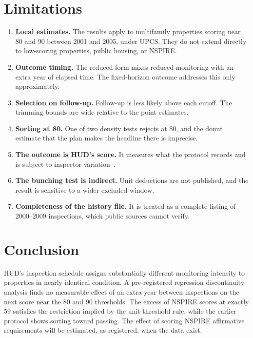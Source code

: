 \documentclass[10pt,twocolumn,letterpaper]{article}
\begin{document}
\section{Limitations}\label{sec:limits}
\begin{enumerate}
\item \textbf{Local estimates.} The results apply to multifamily properties scoring near 80 and 90 between 2001 and 2005, under UPCS. They do not extend directly to low-scoring properties, public housing, or NSPIRE.
\item \textbf{Outcome timing.} The reduced form mixes reduced monitoring with an extra year of elapsed time. The fixed-horizon outcome addresses this only approximately.
\item \textbf{Selection on follow-up.} Follow-up is less likely above each cutoff. The trimming bounds are wide relative to the point estimates.
\item \textbf{Sorting at 80.} One of two density tests rejects at 80, and the donut estimate that the plan makes the headline there is imprecise.
\item \textbf{The outcome is HUD's score.} It measures what the protocol records and is subject to inspector variation~\cite{gao2019}.
\item \textbf{The bunching test is indirect.} Unit deductions are not published, and the result is sensitive to a wider excluded window.
\item \textbf{Completeness of the history file.} It is treated as a complete listing of 2000--2009 inspections, which public sources cannot verify.
\end{enumerate}

\section{Conclusion}
HUD's inspection schedule assigns substantially different monitoring intensity to properties in nearly identical condition. A pre-registered regression discontinuity analysis finds no measurable effect of an extra year between inspections on the next score near the 80 and 90 thresholds. The excess of NSPIRE scores at exactly 59 satisfies the restriction implied by the unit-threshold rule, while the earlier protocol shows sorting toward passing. The effect of scoring NSPIRE affirmative requirements will be estimated, as registered, when the data exist.
\end{document}
